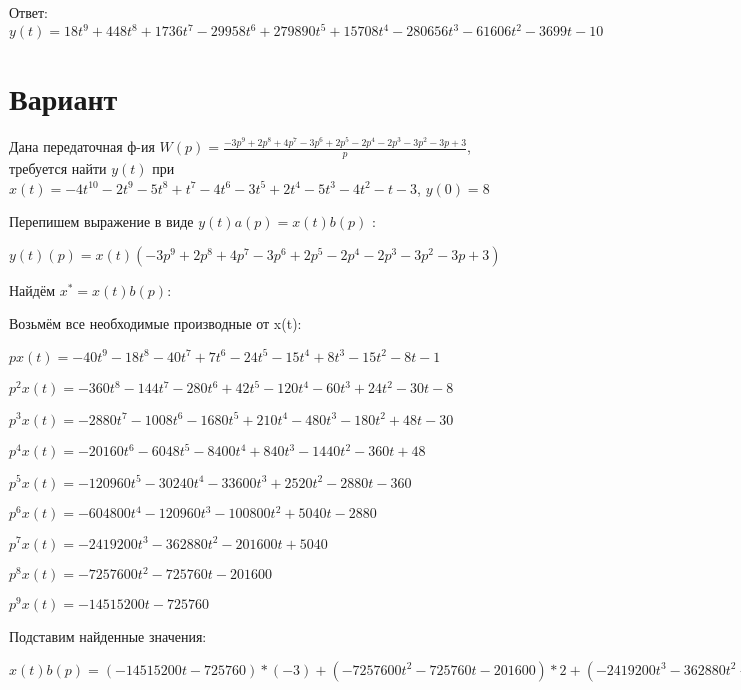 \documentclass{article}
\begin{document}
{{Ответ: $y(t) = 18t^{9}+448t^{8}+1736t^{7}-29958t^{6}+279890t^{5}+15708t^{4}-280656t^{3}-61606t^{2}-3699t-10$

\section{Вариант}

Дана передаточная ф-ия $W(p)=\frac{-3p^{9}+2p^{8}+4p^{7}-3p^{6}+2p^{5}-2p^{4}-2p^{3}-3p^{2}-3p+3}{p}$, требуется найти $y(t)$ при $x(t)=-4t^{10}-2t^{9}-5t^{8}+t^{7}-4t^{6}-3t^{5}+2t^{4}-5t^{3}-4t^{2}-t-3$, $y(0)=8$

Перепишем выражение в виде $y(t)a(p)=x(t)b(p)$ :

$y(t)(p)=x(t)(-3p^{9}+2p^{8}+4p^{7}-3p^{6}+2p^{5}-2p^{4}-2p^{3}-3p^{2}-3p+3)$

Найдём $x^*=x(t)b(p)$:

Возьмём все необходимые производные от x(t):

$px(t)=-40t^{9}-18t^{8}-40t^{7}+7t^{6}-24t^{5}-15t^{4}+8t^{3}-15t^{2}-8t-1$

$p^2x(t)=-360t^{8}-144t^{7}-280t^{6}+42t^{5}-120t^{4}-60t^{3}+24t^{2}-30t-8$

$p^3x(t)=-2880t^{7}-1008t^{6}-1680t^{5}+210t^{4}-480t^{3}-180t^{2}+48t-30$

$p^4x(t)=-20160t^{6}-6048t^{5}-8400t^{4}+840t^{3}-1440t^{2}-360t+48$

$p^5x(t)=-120960t^{5}-30240t^{4}-33600t^{3}+2520t^{2}-2880t-360$

$p^6x(t)=-604800t^{4}-120960t^{3}-100800t^{2}+5040t-2880$

$p^7x(t)=-2419200t^{3}-362880t^{2}-201600t+5040$

$p^8x(t)=-7257600t^{2}-725760t-201600$

$p^9x(t)=-14515200t-725760$

Подставим найденные значения:

$x(t)b(p) = (-14515200t-725760)*(-3)+(-7257600t^{2}-725760t-201600)*2+(-2419200t^{3}-362880t^{2}-201600t+5040)*4+(-604800t^{4}-120960t^{3}-100800t^{2}+5040t-2880)*(-3)+(-120960t^{5}-30240t^{4}-33600t^{3}+2520t^{2}-2880t-360)*2+(-20160t^{6}-6048t^{5}-8400t^{4}+840t^{3}-1440t^{2}-360t+48)*(-2)+(-2880t^{7}-1008t^{6}-1680t^{5}+210t^{4}-480t^{3}-180t^{2}+48t-30)*(-2)+(-360t^{8}-144t^{7}-280t^{6}+42t^{5}-120t^{4}-60t^{3}+24t^{2}-30t-8)*(-3)+(-40t^{9}-18t^{8}-40t^{7}+7t^{6}-24t^{5}-15t^{4}+8t^{3}-15t^{2}-8t-1)*(-3)+(-40t^{9}-18t^{8}-40t^{7}+7t^{6}-24t^{5}-15t^{4}+8t^{3}-15t^{2}-8t-1)*3=1080t^{8}+6192t^{7}+43176t^{6}-226590t^{5}+1770660t^{4}-9381660t^{3}-15656112t^{2}+41267514t$





}}
\end{document}

